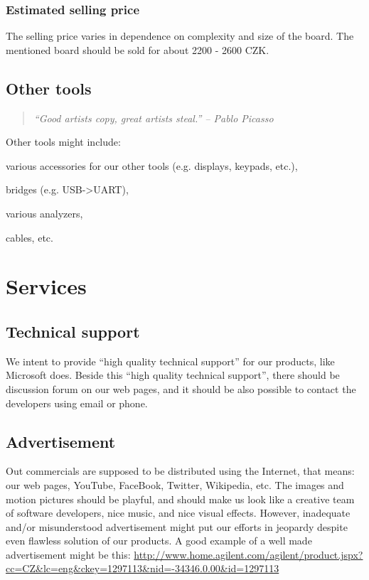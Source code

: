 \documentclass[a4paper,twoside,15pt]{book}
\begin{document}
            \subsubsection{Estimated selling price}
                The selling price varies in dependence on complexity and size of the board. The mentioned board should be sold for about 2200 - 2600 CZK.

        \subsection{Other tools}
            \begin{quote}
                \textit{``Good artists copy, great artists steal.'' -- Pablo Picasso}
            \end{quote}
            Other tools might include:
            \begin{dinglist}{73}
                \setlength{\itemsep}{-3pt}
                \item various accessories for our other tools (e.g. displays, keypads, etc.),
                \item bridges (e.g. USB->UART),
                \item various analyzers,
                \item cables, etc.
            \end{dinglist}

    \section{Services}
        \subsection{Technical support}
            We intent to provide ``high quality technical support'' for our products, like Microsoft does. Beside this ``high quality technical support'', there should be discussion forum on our web pages, and it should be also possible to contact the developers using email or phone.

        \subsection{Advertisement}
            Out commercials are supposed to be distributed using the Internet, that means: our web pages, YouTube, FaceBook, Twitter, Wikipedia, etc. The images and motion pictures should be playful, and should make us look like a creative team of software developers, nice music, and nice visual effects. However, inadequate and/or misunderstood advertisement might put our efforts in jeopardy despite even flawless solution of our products. A good example of a well made advertisement might be this: \url{http://www.home.agilent.com/agilent/product.jspx?cc=CZ&lc=eng&ckey=1297113&nid=-34346.0.00&id=1297113}
\end{document}
